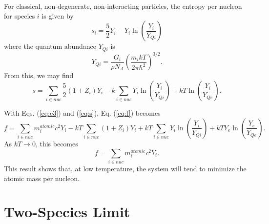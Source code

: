 \documentclass{article}    %
\begin{document}
For classical, non-degenerate, non-interacting particles, the entropy per
nucleon for species $i$ is given by
\begin{equation}
s_i = \frac{5}{2}Y_i - Y_i \ln\left(\frac{Y_i}{Y_{Qi}}\right)
\label{eq:si}
\end{equation}
where the quantum abundance $Y_{Qi}$ is
\begin{equation}
Y_{Qi} = \frac{G_i}{\rho N_A} \left(\frac{m_ikT}{2\pi\hbar^2}\right)^{3/2}.
\label{eq:yq}
\end{equation}
From this, we may find
\begin{equation}
s = \sum_{i \in nuc} \frac{5}{2} \left(1 + Z_i\right) Y_i
- k \sum_{i \in nuc} Y_i \ln\left(\frac{Y_i}{Y_{Qi}}\right) +
kT \ln\left(\frac{Y_i}{Y_{Qe}}\right).
\label{eq:s}
\end{equation}

With Eqs. (\ref{eq:e3}) and (\ref{eq:s}), Eq. (\ref{eq:f}) becomes
\begin{equation}
f = \sum_{i \in nuc} m_i^{atomic}c^2 Y_i -
kT \sum_{i \in nuc} \left(1 + Z_i\right) Y_i +
kT \sum_{i \in nuc} Y_i \ln\left(\frac{Y_i}{Y_{Qi}}\right) +
kT Y_e \ln\left(\frac{Y_e}{Y_{Qe}}\right).
\label{eq:f_final}
\end{equation}
As $kT \to 0$, this becomes
\begin{equation}
f = \sum_{i \in nuc} m_i^{atomic}c^2 Y_i.
\label{eq:f_low}
\end{equation}
This result shows that, at low temperature, the system will tend to
minimize the atomic mass per nucleon.

\section{Two-Species Limit}
\label{sec:two_species}
\end{document}
